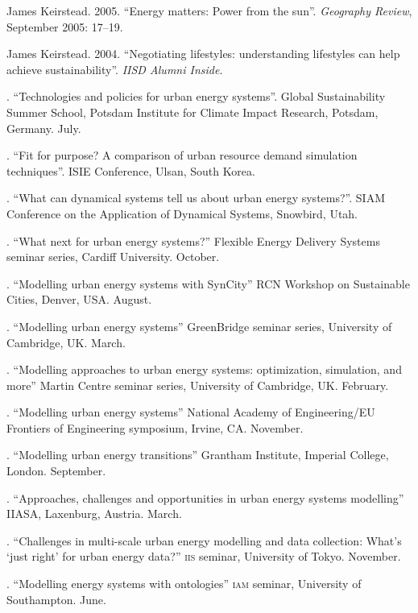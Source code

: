 \documentclass[11pt,a4paper]{article}
\begin{document}
\ind James Keirstead. 2005. ``Energy matters: Power from the sun''.  \emph{Geography Review}, September 2005: 17--19.

\ind James Keirstead. 2004. ``Negotiating lifestyles: understanding lifestyles can help achieve sustainability''. \emph{IISD Alumni Inside}.

 \bigskip

\noindent{}%
%
. ``Technologies and policies for urban energy systems''.  Global Sustainability Summer School, Potsdam Institute for Climate Impact Research, Potsdam, Germany. July.

. ``Fit for purpose?  A comparison of urban resource demand simulation techniques''.  ISIE Conference, Ulsan, South Korea.

. ``What can dynamical systems tell us about urban energy systems?''.  SIAM Conference on the Application of Dynamical Systems, Snowbird, Utah. 

. ``What next for urban energy systems?'' Flexible Energy Delivery Systems seminar series, Cardiff University. October.

. ``Modelling urban energy systems with SynCity'' RCN Workshop on Sustainable Cities, Denver, USA.  August.

. ``Modelling urban energy systems'' GreenBridge seminar series, University of Cambridge, UK. March.

. ``Modelling approaches to urban energy systems: optimization, simulation, and more'' Martin Centre seminar series, University of Cambridge, UK. February.

. ``Modelling urban energy systems'' National Academy of Engineering/EU Frontiers of Engineering symposium, Irvine, CA. November.

. ``Modelling urban energy transitions'' Grantham Institute, Imperial College, London. September.

. ``Approaches, challenges and opportunities in urban energy systems modelling'' IIASA, Laxenburg, Austria. March.

. ``Challenges in multi-scale urban energy modelling and data collection: What's `just right' for urban energy data?'' \textsc{iis} seminar, University of Tokyo. November.

. ``Modelling energy systems with ontologies'' \textsc{iam} seminar, University of Southampton. June.
\end{document}

